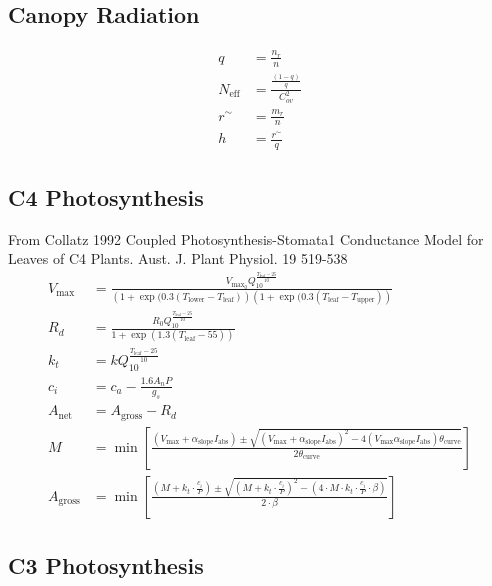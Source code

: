 \documentclass[10pt]{article}
\begin{document}
\subsection*{Canopy Radiation}
\begin{align}
 q  &=  \frac{n_r}{n} \label{eqn:q} \\
 N_\text{eff}  &=  \frac{\frac{(1-q)}{q}}{C_{ov}^{2}} \label{eqn:Neff}\\
 r^{\sim}  &=  \frac{m_r}{n} \label{eqn:rsim} \\
 h  &=  \frac{r^{\sim}}{q} \label{eqn:h} 
\end{align}


 \subsection*{C4 Photosynthesis}
 From Collatz 1992 Coupled Photosynthesis-Stomata1 Conductance Model for Leaves of C4 Plants. Aust. J. Plant Physiol. 19 519-538
 \begin{align}
 V_\text{max}&=\frac{V_{\text{max}_0}Q_{10}^{\frac{T_\text{leaf}-25}{10}}}{\left(1+\exp(0.3(T_\text{lower}-T_\text{leaf})\right)\left(1+\exp(0.3(T_\text{leaf}-T_\text{upper})\right)}\label{eqn:Vmax}\\
 R_d&= \frac{R_0Q_{10}^{\frac{T_\text{leaf}-25}{10}}}{1+\exp(1.3(T_\text{leaf}-55))}\label{eqn:Rd}\\
 k_t&=kQ_{10}^{\frac{T_\text{leaf}-25}{10}}\label{eqn:kt}\\
 c_i &=c_a-\frac{1.6A_nP}{g_s}\label{eqn:ci}\\
 A_\text{net}&=A_\text{gross}-R_d\label{eqn:Anet}\\
 M &= \min\left[\frac{\scriptstyle(V_\text{max}+\alpha_{\text{slope}} I_\text{abs}) \pm \sqrt{(V_\text{max}+\alpha_\text{slope}I_\text{abs})^{2} - 4  (V_\text{max} \alpha_{\text{slope}}  I_\text{abs}) \theta_\text{curve}}}{2  \theta_\text{curve}}\right] \label{eqn:M} \\
 A_\text{gross} &= \min\left[ \frac{ \left( M + k_{t} \cdot \frac{c_{i}}{P} \right) \pm \sqrt{ \left(M + k_{t} \cdot \frac{c_{i}}{P} \right)^2 - \left( 4 \cdot M \cdot k_{t} \cdot \frac{c_{i}}{P} \cdot \beta \right)}}{2 \cdot \beta}\right] \label{eqn:Agross}
 \end{align}

\newpage
\subsection*{C3 Photosynthesis}
\end{document}
